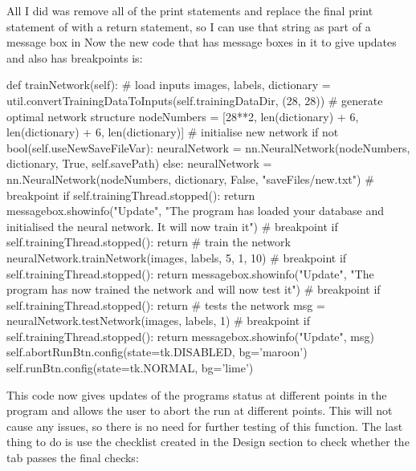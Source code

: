 \documentclass{report}
\begin{document}
All I did was remove all of the print statements and replace the final print statement of  with a return statement, so I can use that string as part of a message box in 
\newline
Now the new code that has message boxes in it to give updates and also has breakpoints is:
\begin{python}
def trainNetwork(self):
    # load inputs
    images, labels, dictionary = util.convertTrainingDataToInputs(self.trainingDataDir, (28, 28))
    # generate optimal network structure
    nodeNumbers = [28**2, len(dictionary) + 6, len(dictionary) + 6, len(dictionary)]
    # initialise new network
    if not bool(self.useNewSaveFileVar):
        neuralNetwork = nn.NeuralNetwork(nodeNumbers, dictionary, True, self.savePath)
    else:
        neuralNetwork = nn.NeuralNetwork(nodeNumbers, dictionary, False, "saveFiles/new.txt")
    # breakpoint
    if self.trainingThread.stopped():
        return
    messagebox.showinfo("Update",
                        "The program has loaded your database and initialised the neural network. It will now train it")
    # breakpoint
    if self.trainingThread.stopped():
        return
    # train the network
    neuralNetwork.trainNetwork(images, labels, 5, 1, 10)
    # breakpoint
    if self.trainingThread.stopped():
        return
    messagebox.showinfo("Update",
                        "The program has now trained the network and will now test it")
    # breakpoint
    if self.trainingThread.stopped():
        return
    # tests the network
    msg = neuralNetwork.testNetwork(images, labels, 1)
    # breakpoint
    if self.trainingThread.stopped():
        return
    messagebox.showinfo("Update", msg)
    self.abortRunBtn.config(state=tk.DISABLED, bg='maroon')
    self.runBtn.config(state=tk.NORMAL, bg='lime')
\end{python}
This code now gives updates of the programs status at different points in the program and allows the user to abort the run at different points. This will not cause any issues, so there is no need for further testing of this function.
\newline
The last thing to do is use the checklist created in the Design section to check whether the tab passes the final checks:
\end{document}
